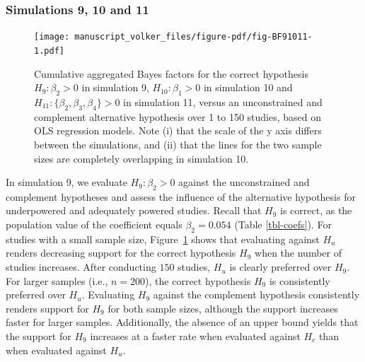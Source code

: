\documentclass[
  authoryear,
  preprint,
  5p,
  twocolumn]{elsarticle}
\begin{document}
\hypertarget{simulations-9-10-and-11}{%
\subsubsection{Simulations 9, 10 and 11}\label{simulations-9-10-and-11}}

\begin{figure}[!t]

{\centering \texttt{[image: manuscript\_volker\_files/figure-pdf/fig-BF91011-1.pdf]}

}

\caption{\label{fig-BF91011}Cumulative aggregated Bayes factors for the
correct hypothesis \(H_9: \beta_2 > 0\) in simulation 9,
\(H_{10}: \beta_1 > 0\) in simulation 10 and
\(H_{11}: \{\beta_2, \beta_3, \beta_4\} > 0\) in simulation 11, versus
an unconstrained and complement alternative hypothesis over 1 to 150
studies, based on OLS regression models. Note (i) that the scale of the
y axis differs between the simulations, and (ii) that the lines for the
two sample sizes are completely overlapping in simulation 10.}

\end{figure}

In simulation 9, we evaluate \(H_9: \beta_2 > 0\) against the
unconstrained and complement hypotheses and assess the influence of the
alternative hypothesis for underpowered and adequately powered studies.
Recall that \(H_9\) is correct, as the population value of the
coefficient equals \(\beta_2 = 0.054\) (Table \ref{tbl-coefs}). For
studies with a small sample size, Figure~\ref{fig-BF91011} shows that
evaluating against \(H_u\) renders decreasing support for the correct
hypothesis \(H_9\) when the number of studies increases. After
conducting \(150\) studies, \(H_u\) is clearly preferred over \(H_9\).
For larger samples (i.e., \(n = 200\)), the correct hypothesis \(H_9\)
is consistently preferred over \(H_u\). Evaluating \(H_9\) against the
complement hypothesis consistently renders support for \(H_9\) for both
sample sizes, although the support increases faster for larger samples.
Additionally, the absence of an upper bound yields that the support for
\(H_9\) increases at a faster rate when evaluated against \(H_c\) than
when evaluated against \(H_u\).
\end{document}
